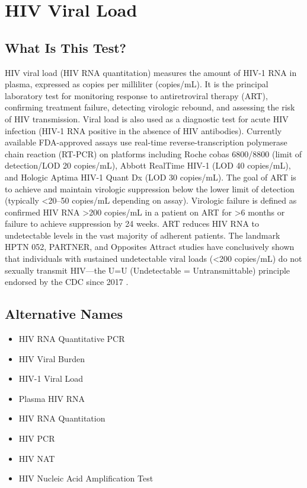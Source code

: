 \chapter{HIV Viral Load}

\section*{What Is This Test?}
HIV viral load (HIV RNA quantitation) measures the amount of HIV-1 RNA in plasma, expressed as copies per milliliter (copies/mL). It is the principal laboratory test for monitoring response to antiretroviral therapy (ART), confirming treatment failure, detecting virologic rebound, and assessing the risk of HIV transmission. Viral load is also used as a diagnostic test for acute HIV infection (HIV-1 RNA positive in the absence of HIV antibodies). Currently available FDA-approved assays use real-time reverse-transcription polymerase chain reaction (RT-PCR) on platforms including Roche cobas 6800/8800 (limit of detection/LOD 20 copies/mL), Abbott RealTime HIV-1 (LOD 40 copies/mL), and Hologic Aptima HIV-1 Quant Dx (LOD 30 copies/mL). The goal of ART is to achieve and maintain virologic suppression below the lower limit of detection (typically <20--50 copies/mL depending on assay). Virologic failure is defined as confirmed HIV RNA >200 copies/mL in a patient on ART for >6 months or failure to achieve suppression by 24 weeks. ART reduces HIV RNA to undetectable levels in the vast majority of adherent patients. The landmark HPTN 052, PARTNER, and Opposites Attract studies have conclusively shown that individuals with sustained undetectable viral loads (<200 copies/mL) do not sexually transmit HIV---the U=U (Undetectable = Untransmittable) principle endorsed by the CDC since 2017 \cite{rodger2019risk}.

\section*{Alternative Names}
\begin{itemize}
  \item HIV RNA Quantitative PCR
  \item HIV Viral Burden
  \item HIV-1 Viral Load
  \item Plasma HIV RNA
  \item HIV RNA Quantitation
  \item HIV PCR
  \item HIV NAT
  \item HIV Nucleic Acid Amplification Test
\end{itemize}
